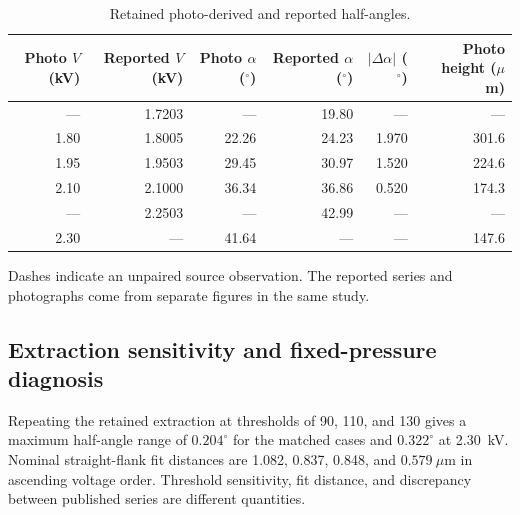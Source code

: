 \begin{table}[htbp]
\centering
\caption{Retained photo-derived and reported half-angles.}\label{tab:angle-comparison}
\small\setlength{\tabcolsep}{5pt}
\begin{tabular}{rrrrrr}
\toprule
\shortstack{Photo $V$\\(kV)} & \shortstack{Reported $V$\\(kV)} & \shortstack{Photo $\alpha$\\($^\circ$)} & \shortstack{Reported $\alpha$\\($^\circ$)} & \shortstack{$|\Delta\alpha|$\\($^\circ$)} & \shortstack{Photo height\\($\mu$m)}\\
\midrule
--- & 1.7203 & --- & 19.80 & --- & ---\\
1.80 & 1.8005 & 22.26 & 24.23 & 1.970 & 301.6\\
1.95 & 1.9503 & 29.45 & 30.97 & 1.520 & 224.6\\
2.10 & 2.1000 & 36.34 & 36.86 & 0.520 & 174.3\\
--- & 2.2503 & --- & 42.99 & --- & ---\\
2.30 & --- & 41.64 & --- & --- & 147.6\\
\bottomrule
\end{tabular}
\par\smallskip\footnotesize Dashes indicate an unpaired source observation. The reported series and photographs come from separate figures in the same study.
\end{table}

\subsection{Extraction sensitivity and fixed-pressure diagnosis}
Repeating the retained extraction at thresholds of 90, 110, and 130 gives a maximum half-angle range of $0.204^\circ$ for the matched cases and $0.322^\circ$ at 2.30~kV. Nominal straight-flank fit distances are 1.082, 0.837, 0.848, and $0.579~\mu$m in ascending voltage order. Threshold sensitivity, fit distance, and discrepancy between published series are different quantities.

